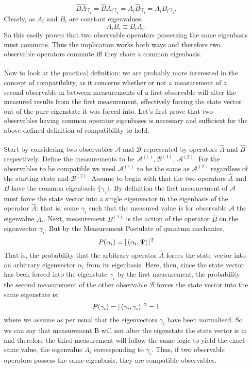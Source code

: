 $$
\hat{B}\hat{A}\gamma_{i}=\hat{B}A_{i}\gamma_{i}=A_{i}\hat{B}\gamma_{i}=A_{i}B_{i}\gamma_{i}.
$$
Clearly, as $A_{i}$ and $B_{i}$ are constant eigenvalues, 
$$
A_{i}B_{i}\equiv B_{i}A_{i}.
$$
So this easily proves that two observable operators possessing the same eigenbasis must commute. Thus the implication works both ways and therefore two observable operators commute iff they share a common eigenbasis.
\\\\
Now to look at the practical definition: we are probably more interested in the concept of compatibility, as it concerns whether or not a measurement of a second observable in between measurements of a first observable will alter the measured results from the first measurement, effectively  forcing the state vector out of the pure eigenstate it was forced into. Let's first prove that two observables having common operator eigenbases is necessary and sufficient for the above defined definition of compatibility to hold.
\\\\
Start by considering two observables $\mathcal{A}$ and $\mathcal{B}$ represented by operators $\hat{A}$ and $\hat{B}$ respectively. Define the measurements to be $\mathcal{A}^{(1)},\mathcal{B}^{(1)}$, $\mathcal{A}^{(2)}$. For the observables to be compatible we need $\mathcal{A}^{(1)}$ to be the same as $\mathcal{A}^{(2)}$ regardless of the starting state and $\mathcal{B}^{(2)}$. Assume to begin with that the two operators $\hat{A}$ and $\hat{B}$ have the common eigenbasis $\{\gamma_{i}\}$. By definition the first measurement of $\mathcal{A}$ must force the state vector into a single eigenvector in the eigenbasis of the operator $\hat{A}$: that is, some $\gamma_{i}$ such that the measured value is for observable $\mathcal{A}$ the eigenvalue $A_{i}$. Next, measurement ${{B}}^{(1)}$ is the action of the operator $\hat{B}$ on the eigenvector $\gamma_{i}$. But by the Measurement Postulate of quantum mechanics,
$$
P(\alpha_{i})=|\left(\alpha_{i},\Psi\right)|^2
$$
That is, the probability that the arbitrary operator $\hat{A}$ forces the state vector into an arbitrary eigenvector $\alpha_{i}$ from its eigenbasis. Here, then, since the state vector has been forced into the eigenstate $\gamma_{i}$ by the first measurement, the probability the second measurement of the other observable $\mathcal{B}$ forces the state vector into the same eigenstate is:
$$
P(\gamma_{i})=|\left(\gamma_{i},\gamma_{i}\right)|^2=1
$$
where we assume as per usual that the eigenvectors $\gamma_{i}$ have been normalised. So we can say that measurement B will not alter the eigenstate the state vector is in and therefore the third measurement will follow the same logic to yield the exact same value, the eigenvalue $A_{i}$ corresponding to $\gamma_{i}$. Thus, if two observable operators possess the same eigenbasis, they are compatible observables.
